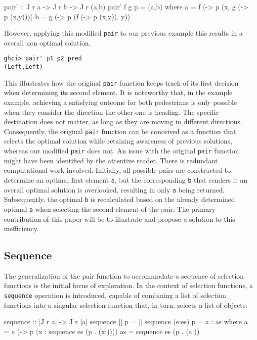 \documentclass[runningheads]{llncs}
\begin{document}
\begin{code}
pair' :: J r a -> J r b -> J r (a,b)
pair' f g p = (a,b)
  where
      a = f (\x -> p (x, g (\y -> p (x,y))))
      b = g (\y -> p (f (\x -> p (x,y)), y))
\end{code}

However, applying this modified \texttt{pair\textquotesingle{}} to our
previous example this results in a overall non optimal solution.

\begin{verbatim}
ghci> pair' p1 p2 pred
(Left,Left)
\end{verbatim}

This illustrates how the original \texttt{pair} function keeps track of
its first decision when determining its second element. It is noteworthy
that, in the example example, achieving a satisfying outcome for both
pedestrians is only possible when they consider the direction the other
one is heading. The specific destination does not matter, as long as
they are moving in different directions. Consequently, the original
\texttt{pair} function can be conceived as a function that selects the
optimal solution while retaining awareness of previous solutions,
whereas our modified \texttt{pair\textquotesingle{}} does not. An issue
with the original \texttt{pair} function might have been identified by
the attentive reader. There is redundant computational work involved.
Initially, all possible pairs are constructed to determine an optimal
first element \texttt{a}, but the corresponding \texttt{b} that renders
it an overall optimal solution is overlooked, resulting in only
\texttt{a} being returned. Subsequently, the optimal \texttt{b} is
recalculated based on the already determined optimal \texttt{a} when
selecting the second element of the pair. The primary contribution of
this paper will be to illustrate and propose a solution to this
inefficiency.

\subsection{Sequence}\label{sequence}

The generalization of the pair function to accommodate a sequence of
selection functions is the initial focus of exploration. In the context
of selection functions, a \texttt{sequence} operation is introduced,
capable of combining a list of selection functions into a singular
selection function that, in turn, selects a list of objects:

\begin{code}
sequence :: [J r a] -> J r [a]
sequence [] p     = []
sequence (e:es) p = a : as
  where 
      a  = e (\x -> p (x : sequence es (p . (x:))))
      as = sequence es (p . (a:))
\end{code}
\end{document}
